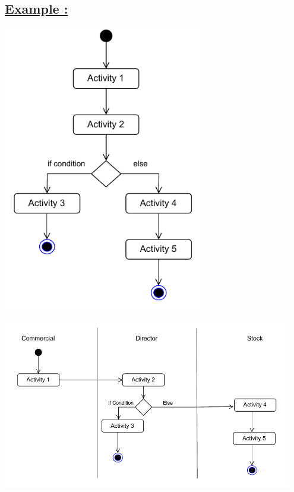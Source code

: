 \subsection*{\underline{Example :}}


\begin{center}
\includegraphics[width=0.65\textwidth,height=0.75\textheight]{Chapters/Diagram/AC/ac1.drawio.pdf}
\end{center}

\begin{center}
\includegraphics[width=0.95\textwidth,height=0.75\textheight]{Chapters/Diagram/AC/ac2.drawio.pdf}
\end{center}



